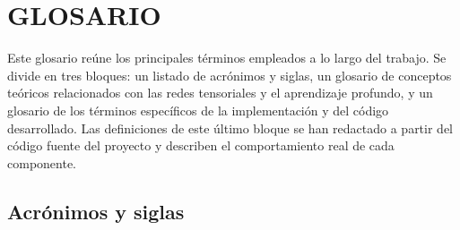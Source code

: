 \chapter*{GLOSARIO}\label{sec:glosario}

Este glosario reúne los principales términos empleados a lo largo del trabajo. Se divide en tres bloques: un listado de acrónimos y siglas, un glosario de conceptos teóricos relacionados con las redes tensoriales y el aprendizaje profundo, y un glosario de los términos específicos de la implementación y del código desarrollado. Las definiciones de este último bloque se han redactado a partir del código fuente del proyecto y describen el comportamiento real de cada componente.

\section*{Acrónimos y siglas}

